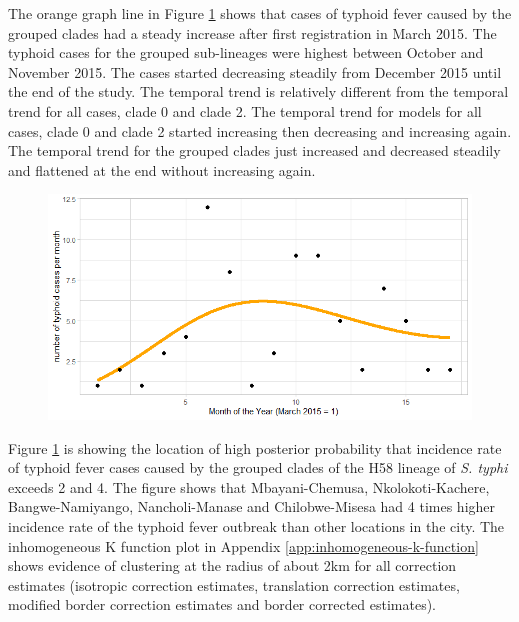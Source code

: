 The orange graph line in Figure \ref{fig:temporal-distribution-grouped-clades} shows that cases of typhoid fever caused by the grouped clades had a steady increase after first registration in March 2015. The typhoid cases for the grouped sub-lineages were highest between October and November 2015. The cases started decreasing steadily from December 2015 until the end of the study. The temporal trend is relatively different from the temporal trend for all cases, clade 0 and clade 2. The temporal trend for models for all cases, clade 0 and clade 2 started increasing then decreasing and increasing again. The temporal trend for the grouped clades just increased and decreased steadily and flattened at the end without increasing again.

\begin{figure}[H]
    \begin{center}
        \includegraphics[scale=0.7]{Long term trend of temporal model - Major 13456.png}
    \end{center}
     \label{fig:temporal-distribution-grouped-clades}
\end{figure}

Figure \ref{fig:temporal-distribution-grouped-clades} is showing the location of high posterior probability that incidence rate of typhoid fever cases caused by the grouped clades of the H58 lineage of \textit{S. typhi} exceeds 2 and 4. The figure shows that Mbayani-Chemusa, Nkolokoti-Kachere, Bangwe-Namiyango, Nancholi-Manase and Chilobwe-Misesa had 4 times higher incidence rate of the typhoid fever outbreak than other locations in the city. The inhomogeneous K function plot in Appendix \ref{app:inhomogeneous-k-function} shows evidence of clustering at the radius of about 2km for all correction estimates (isotropic correction estimates, translation correction estimates, modified border correction estimates and border corrected estimates).

